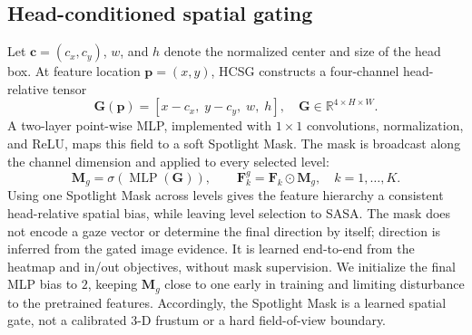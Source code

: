 \documentclass{article}
\begin{document}
\subsection{Head-conditioned spatial gating}
Let $\mathbf c=(c_x,c_y)$, $w$, and $h$ denote the normalized center and size of the head box. At feature location $\mathbf p=(x,y)$, HCSG constructs a four-channel head-relative tensor
\begin{equation}
  \mathbf G(\mathbf p)=[x-c_x,\;y-c_y,\;w,\;h],
  \quad \mathbf G\in\mathbb R^{4\times H\times W}.
  \label{eq:geometry}
\end{equation}
A two-layer point-wise MLP, implemented with $1\times1$ convolutions, normalization, and ReLU, maps this field to a soft Spotlight Mask. The mask is broadcast along the channel dimension and applied to every selected level:
\begin{equation}
  \mathbf M_g=\sigma(\operatorname{MLP}(\mathbf G)), \qquad
  \mathbf F_k^g=\mathbf F_k\odot\mathbf M_g,\quad k=1,\ldots,K.
  \label{eq:gating}
\end{equation}
Using one Spotlight Mask across levels gives the feature hierarchy a consistent head-relative spatial bias, while leaving level selection to SASA. The mask does not encode a gaze vector or determine the final direction by itself; direction is inferred from the gated image evidence. It is learned end-to-end from the heatmap and in/out objectives, without mask supervision. We initialize the final MLP bias to $2$, keeping $\mathbf M_g$ close to one early in training and limiting disturbance to the pretrained features. Accordingly, the Spotlight Mask is a learned spatial gate, not a calibrated 3-D frustum or a hard field-of-view boundary.
\end{document}
